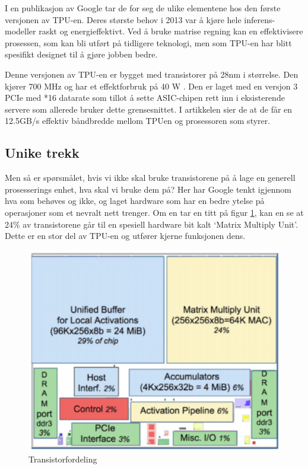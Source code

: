 I en publikasjon av Google \cite{tpu_main} tar de for seg de ulike elementene hos den første versjonen av TPU-en. Deres største behov i 2013 var å kjøre hele inferens-modeller raskt og energieffektivt. Ved å bruke matrise regning kan en effektivisere prosessen, som kan bli utført på tidligere teknologi, men som TPU-en har blitt spesifikt designet til å gjøre jobben bedre.

Denne versjonen av TPU-en er bygget med transistorer på 28nm i størrelse. Den kjører 700 MHz og har et effektforbruk på 40 W \cite{tpu_main}. Den er laget med en versjon 3 PCIe med *16 datarate som tillot å sette ASIC-chipen rett inn i eksisterende servere som allerede bruker dette grensesnittet. I artikkelen sier de at de får en 12.5GB/s effektiv båndbredde mellom TPUen og prosessoren som styrer.
 
\subsection{Unike trekk}
Men så er spørsmålet, hvis vi ikke skal bruke transistorene på å lage en generell prosesserings enhet, hva skal vi bruke dem på? Her har Google tenkt igjennom hva som behøves og ikke, og laget hardware som har en bedre ytelse på operasjoner som et nevralt nett trenger. Om en tar en titt på figur \ref{fig:transistor}, kan en se at 24\% av transistorene går til en spesiell hardware bit kalt ‘Matrix Multiply Unit’. Dette er en stor del av TPU-en og utfører kjerne funksjonen dens.

\begin{figure}[ht]
    \centering
    \includegraphics[width=\textwidth]{images/tpu_transistor_fordeling.jpg}
    \caption{Transistorfordeling}
    \label{fig:transistor}
\end{figure}
 

